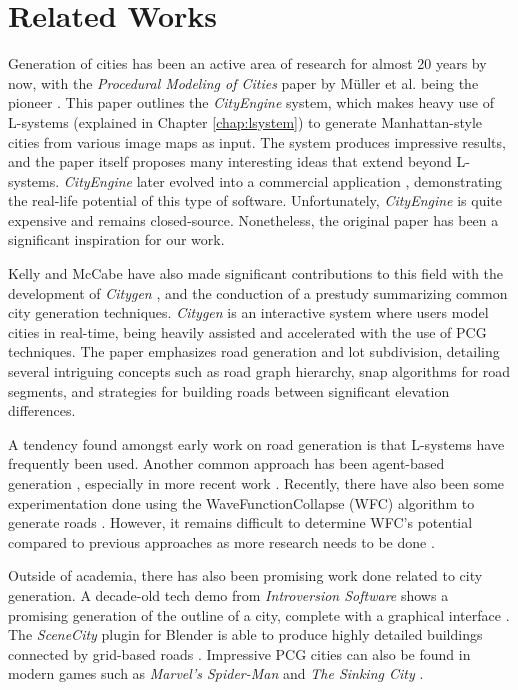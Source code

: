 \section{Related Works}

Generation of cities has been an active area of research for almost 20 years by now, with the \textit{Procedural Modeling of Cities} paper by Müller et al. being the pioneer \cite{muller_city_gen}.
This paper outlines the \textit{CityEngine} system, which makes heavy use of L-systems (explained in Chapter \ref{chap:lsystem}) to generate Manhattan-style cities from various image maps as input.
The system produces impressive results, and the paper itself proposes many interesting ideas that extend beyond L-systems.
\textit{CityEngine} later evolved into a commercial application \cite{esri}, demonstrating the real-life potential of this type of software.
Unfortunately, \textit{CityEngine} is quite expensive and remains closed-source.
Nonetheless, the original paper has been a significant inspiration for our work.

Kelly and McCabe have also made significant contributions to this field with the development of \textit{Citygen} \cite{citygen_paper}, and the conduction of a prestudy \cite{citygen_paper_prestudy} summarizing common city generation techniques. 
\textit{Citygen} is an interactive system where users model cities in real-time, being heavily assisted and accelerated with the use of PCG techniques.
The paper emphasizes road generation and lot subdivision, detailing several intriguing concepts such as road graph hierarchy, snap algorithms for road segments, and strategies for building roads between significant elevation differences.

A tendency found amongst early work on road generation is that L-systems have frequently been used.
Another common approach has been agent-based generation \cite{agent_based_roads}, especially in more recent work \cite{tmwhere} \cite{robin}.
Recently, there have also been some experimentation done using the WaveFunctionCollapse (WFC) algorithm \cite{wavefunc} to generate roads \cite{wavefunc_roads}.
However, it remains difficult to determine WFC's potential compared to previous approaches as more research needs to be done \cite[p.50]{wavefunc_roads}.

Outside of academia, there has also been promising work done related to city generation.
A decade-old tech demo from \textit{Introversion Software} shows a promising generation of the outline of a city, complete with a graphical interface \cite{subversion}.
The \textit{SceneCity} plugin for Blender \cite{blender} is able to produce highly detailed buildings connected by grid-based roads \cite{scenecity}.
Impressive PCG cities can also be found in modern games such as \textit{Marvel's Spider-Man} \cite{pcg_spiderman} and \textit{The Sinking City} \cite{pcg_sunken_city}.

